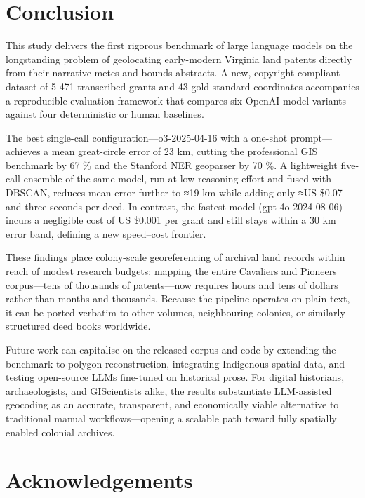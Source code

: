 \section{Conclusion}\label{conclusion}

This study delivers the first rigorous benchmark of large language
models on the longstanding problem of geolocating early-modern Virginia
land patents directly from their narrative metes-and-bounds abstracts. A
new, copyright-compliant dataset of 5 471 transcribed grants and 43
gold-standard coordinates accompanies a reproducible evaluation
framework that compares six OpenAI model variants against four
deterministic or human baselines.

The best single-call configuration---o3-2025-04-16 with a one-shot
prompt---achieves a mean great-circle error of 23 km, cutting the
professional GIS benchmark by 67 \% and the Stanford NER geoparser by 70
\%. A lightweight five-call ensemble of the same model, run at low
reasoning effort and fused with DBSCAN, reduces mean error further to
≈19 km while adding only ≈US \$0.07 and three seconds per deed. In
contrast, the fastest model (gpt-4o-2024-08-06) incurs a negligible cost
of US \$0.001 per grant and still stays within a 30 km error band,
defining a new speed--cost frontier.

These findings place colony-scale georeferencing of archival land
records within reach of modest research budgets: mapping the entire
Cavaliers and Pioneers corpus---tens of thousands of patents---now
requires hours and tens of dollars rather than months and thousands.
Because the pipeline operates on plain text, it can be ported verbatim
to other volumes, neighbouring colonies, or similarly structured deed
books worldwide.

Future work can capitalise on the released corpus and code by extending
the benchmark to polygon reconstruction, integrating Indigenous spatial
data, and testing open-source LLMs fine-tuned on historical prose. For
digital historians, archaeologists, and GIScientists alike, the results
substantiate LLM-assisted geocoding as an accurate, transparent, and
economically viable alternative to traditional manual
workflows---opening a scalable path toward fully spatially enabled
colonial archives.

\section{Acknowledgements}\label{acknowledgements}

